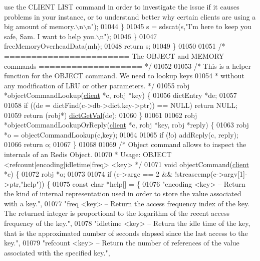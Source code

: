 \begin{DoxyCode}
{{{{       use the CLIENT LIST command in order to investigate the issue if it causes problems in your instance, or to
       understand better why certain clients are using a big amount of memory.\(\backslash\)n\(\backslash\)n"});
01044         \}
01045         s = sdscat(s,\textcolor{stringliteral}{"I'm here to keep you safe, Sam. I want to help you.\(\backslash\)n"});
01046     \}
01047     freeMemoryOverheadData(mh);
01048     \textcolor{keywordflow}{return} s;
01049 \}
01050 
01051 \textcolor{comment}{/* ======================= The OBJECT and MEMORY commands =================== */}
01052 
01053 \textcolor{comment}{/* This is a helper function for the OBJECT command. We need to lookup keys}
01054 \textcolor{comment}{ * without any modification of LRU or other parameters. */}
01055 robj *objectCommandLookup(\hyperlink{structclient}{client} *c, robj *key) \{
01056     dictEntry *de;
01057 
01058     \textcolor{keywordflow}{if} ((de = dictFind(c->db->dict,key->ptr)) == NULL) \textcolor{keywordflow}{return} NULL;
01059     \textcolor{keywordflow}{return} (robj*) \hyperlink{dict_8h_ae8d2cc391873b2bea2b87c4f80f43120}{dictGetVal}(de);
01060 \}
01061 
01062 robj *objectCommandLookupOrReply(\hyperlink{structclient}{client} *c, robj *key, robj *reply) \{
01063     robj *o = objectCommandLookup(c,key);
01064 
01065     \textcolor{keywordflow}{if} (!o) addReply(c, reply);
01066     \textcolor{keywordflow}{return} o;
01067 \}
01068 
01069 \textcolor{comment}{/* Object command allows to inspect the internals of an Redis Object.}
01070 \textcolor{comment}{ * Usage: OBJECT <refcount|encoding|idletime|freq> <key> */}
01071 \textcolor{keywordtype}{void} objectCommand(\hyperlink{structclient}{client} *c) \{
01072     robj *o;
01073 
01074     \textcolor{keywordflow}{if} (c->argc == 2 && !strcasecmp(c->argv[1]->ptr,\textcolor{stringliteral}{"help"})) \{
01075         \textcolor{keyword}{const} \textcolor{keywordtype}{char} *help[] = \{
01076 \textcolor{stringliteral}{"encoding <key> -- Return the kind of internal representation used in order to store the value
       associated with a key."},
01077 \textcolor{stringliteral}{"freq <key> -- Return the access frequency index of the key. The returned integer is proportional to
       the logarithm of the recent access frequency of the key."},
01078 \textcolor{stringliteral}{"idletime <key> -- Return the idle time of the key, that is the approximated number of seconds elapsed
       since the last access to the key."},
01079 \textcolor{stringliteral}{"refcount <key> -- Return the number of references of the value associated with the specified key."},
}}}
\end{DoxyCode}

